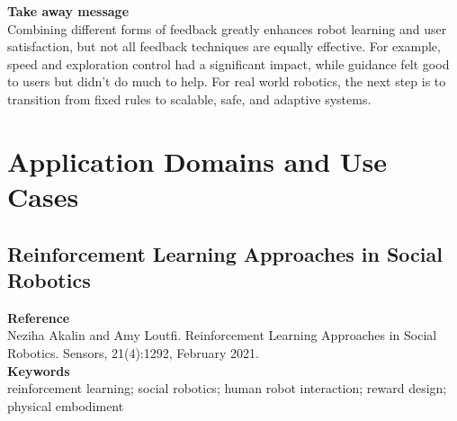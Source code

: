 \documentclass[report.tex]{subfiles}
\begin{document}
\noindent\textbf{Take away message}  \\
Combining different forms of feedback greatly enhances robot learning and user satisfaction, but not all feedback techniques are equally effective. For example, speed and exploration control had a significant impact, while guidance felt good to users but didn't do much to help. For real world robotics, the next step is to transition from fixed rules to scalable, safe, and adaptive systems.










\section{Application Domains and Use Cases}
\subsection{Reinforcement Learning Approaches in Social Robotics} 

\noindent\textbf{Reference} \\
\cite{akalin_reinforcement_2021}Neziha Akalin and Amy Loutfi. Reinforcement Learning Approaches in Social Robotics. Sensors, 21(4):1292, February 2021.\\


\noindent\textbf{Keywords} \\
reinforcement learning; social robotics; human robot interaction; reward design; physical embodiment

   \\
\end{document}
